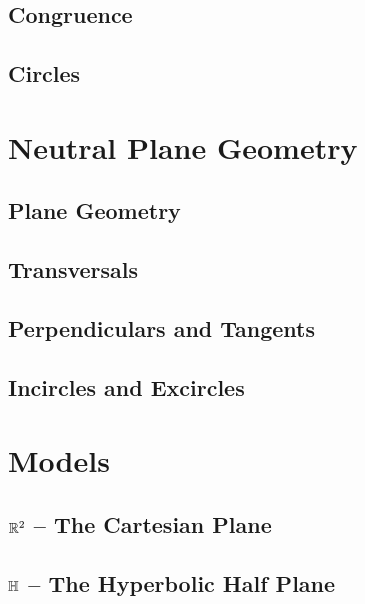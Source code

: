 \documentclass{memoir}
\begin{document}
  \section{Congruence}
    
    \newpage

  \section{Circles}
    


\chapter{Neutral Plane Geometry}
\newpage

  \section{Plane Geometry}
    
    \newpage

  \section{Transversals}
    
    \newpage

  \section{Perpendiculars and Tangents}
    
    \newpage

  \section{Incircles and Excircles}
    


\chapter{Models}
\newpage

  \section{\(\mathbb{R}^2\) -- The Cartesian Plane}
    
    \newpage

  \section{\(\mathbb{H}\) -- The Hyperbolic Half Plane}
    
    \newpage
\end{document}
